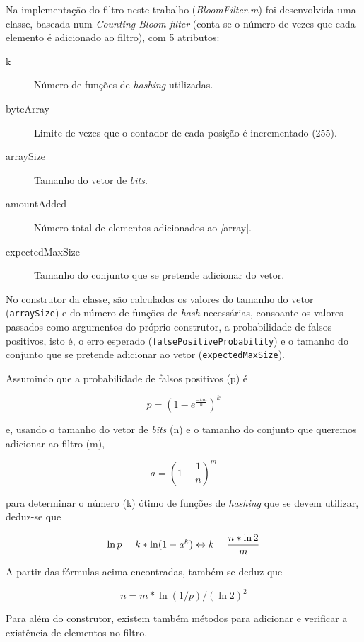 \documentclass[a4paper,11pt,openright,oneside]{report}
\begin{document}
Na implementação do filtro neste trabalho (\textit{BloomFilter.m}) foi desenvolvida uma classe, baseada num \textit{Counting Bloom-filter} (conta-se o número de vezes que cada elemento é adicionado ao filtro), com 5 atributos:
\begin{description}
\item[k]
Número de funções de \textit{hashing} utilizadas.
\item[byteArray]
Limite de vezes que o contador de cada posição é incrementado (255).
\item[arraySize]
Tamanho do vetor de \textit{bits}.
\item[amountAdded]
Número total de elementos adicionados ao \textit[array].
\item[expectedMaxSize]
Tamanho do conjunto que se pretende adicionar do vetor.
\end{description}

No construtor da classe, são calculados os valores do tamanho do vetor (\texttt{arraySize}) e do número de funções de \textit{hash} necessárias, consoante os valores passados como argumentos do próprio construtor, a probabilidade de falsos positivos, isto é, o erro esperado (\texttt{falsePositiveProbability}) e o tamanho do conjunto que se pretende adicionar ao vetor (\texttt{expectedMaxSize}). 

Assumindo que a probabilidade de falsos positivos (p) é

$$ p =  (1 - e^\frac{-km}{n})^k $$

e, usando o tamanho do vetor de \textit{bits} (n) e o tamanho do conjunto que queremos adicionar ao filtro (m),

$$ a = (1 - \frac{1}{n})^m $$

para determinar o número (k) ótimo de funções de \textit{hashing} que se devem utilizar, deduz-se que

$$ \ln p = k * \ln (1 - a^k) \\
\leftrightarrow k =  \frac{n * \ln 2}{m}$$

A partir das fórmulas acima encontradas, também se deduz que

$$ n = m * \ln (1 / p) / (\ln 2) ^ 2  $$

Para além do construtor, existem também métodos para adicionar e verificar a existência de elementos no filtro.
\end{document}
